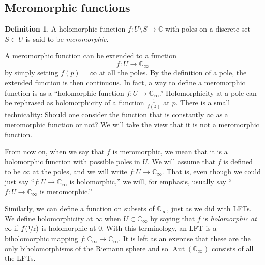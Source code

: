 \documentclass[12pt,openany]{book}
\newcommand{\Aut}{\operatorname{Aut}}
\newcommand{\C}{{\mathbb{C}}}
\newcommand{\myindex}[1]{#1\index{#1}}
\newcommand{\myquote}[1]{``#1''}
\theoremstyle{plain}
\theoremstyle{remark}
\theoremstyle{definition}
\newtheorem{defn}[thm]{Definition}
\theoremstyle{exercise}
\theoremstyle{example}
\begin{document}
\subsection{Meromorphic functions}
\label{subsec:meromorphic}

\begin{defn}
A holomorphic function $f \colon U \setminus S \to \C$ with poles on a
discrete set $S \subset U$ is said to be \emph{\myindex{meromorphic}}.
\end{defn}

A meromorphic function can be extended to a function
\begin{equation*}
f \colon U \to \C_{\infty}
\end{equation*}
by simply setting $f(p) = \infty$ at all the poles.
By the definition of a pole, the extended function is then continuous.
In fact, a way to define
a meromorphic function is as a
\myquote{holomorphic function $f \colon U \to \C_{\infty}$.}
Holomorphicity at a pole can be
rephrased as holomorphicity of a function $\frac{1}{f(z)}$ at $p$.
There is a small technicality: Should one consider the function
that is constantly $\infty$ as a meromorphic function or not?
We will take the view that it is not a meromorphic function.

From now on, when we say that $f$ is
meromorphic, we mean that it is a holomorphic function with possible
poles in $U$.  We will assume that $f$ is defined to be $\infty$
at the poles, and
we will write $f \colon U \to \C_\infty$.  That is, even though we
could just say \myquote{$f \colon U \to \C_\infty$ is holomorphic,} we will, for emphasis,
usually say \myquote{$f \colon U \to \C_\infty$ is meromorphic.}

Similarly, we can define a function on subsets of $\C_\infty$, just as
we did with LFTs.
We define holomorphicity at $\infty$ when $U \subset
\C_\infty$ by saying that $f$ is \emph{\myindex{holomorphic at $\infty$}}
if $f(\nicefrac{1}{z})$ is holomorphic at $0$.
With this terminology, an LFT is a biholomorphic mapping $f \colon
\C_\infty \to \C_\infty$.  It is left as an exercise that
these are the only biholomorphisms of the Riemann sphere and so
$\Aut(\C_\infty)$ consists of all the LFTs.
\end{document}

